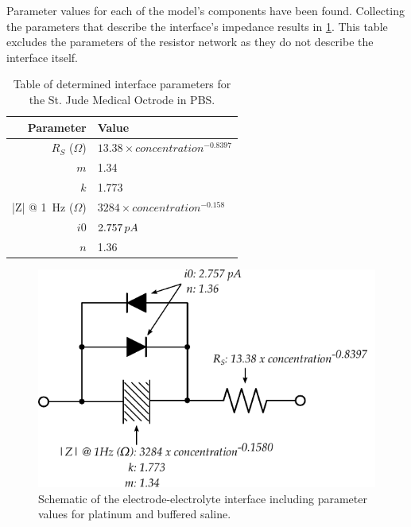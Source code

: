       Parameter values for each of the model's components have been found.
      Collecting the parameters that describe the interface's impedance results in \cref{tab:ModelParameters}.
      This table excludes the parameters of the resistor network as they do not describe the interface itself.

      \begin{table}
        \caption{Table of determined interface parameters for the St. Jude Medical Octrode in PBS.}
        \label{tab:ModelParameters}
        \begin{center}
          \begin{tabular}{r | l}
              Parameter & Value \\
              \hline

              $R_{S}$ ($\Omega$)& $13.38 \times concentration^{-0.8397}$ \\
              
              $m$& 1.34\\
              $k$ & 1.773\\
              |Z| @ \SI{1}{\hertz} ($\Omega$)& $3284 \times concentration^{-0.158}$ \\

              $i0$ & $2.757\thinspace pA$\\
              $n$ & 1.36\\
          \end{tabular}
        \end{center}
      \end{table}

      \begin{figure}
        \centering
        \includegraphics{content/pt2/08-InterfaceParameters/graphics/interfaceSchematic_PBS_Solved}
        \caption{\label{fig:interfaceSchematic_PBS_Solved} Schematic of the electrode-electrolyte interface including parameter values for platinum and buffered saline.}
      \end{figure}


